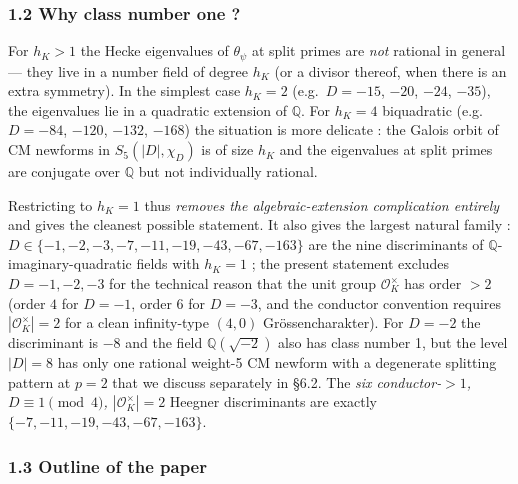 \documentclass[
  11pt,
  a4paper,
]{amsart}
\begin{document}
\hypertarget{why-class-number-one}{%
\subsubsection{1.2 Why class number one ?}\label{why-class-number-one}}

For \(h_K > 1\) the Hecke eigenvalues of \(\theta_\psi\) at split primes are \emph{not} rational in general --- they live in a number field of degree \(h_K\) (or a divisor thereof, when there is an extra symmetry). In the simplest case \(h_K = 2\) (e.g.~\(D = -15\), \(-20\), \(-24\), \(-35\)), the eigenvalues lie in a quadratic extension of \(\mathbb{Q}\). For \(h_K = 4\) biquadratic (e.g.~\(D = -84\), \(-120\), \(-132\), \(-168\)) the situation is more delicate : the Galois orbit of CM newforms in \(S_5(|D|, \chi_D)\) is of size \(h_K\) and the eigenvalues at split primes are conjugate over \(\mathbb{Q}\) but not individually rational.

Restricting to \(h_K = 1\) thus \emph{removes the algebraic-extension complication entirely} and gives the cleanest possible statement. It also gives the largest natural family : \(D \in \{-1, -2, -3, -7, -11, -19, -43, -67, -163\}\) are the nine discriminants of \(\mathbb{Q}\)-imaginary-quadratic fields with \(h_K = 1\) ; the present statement excludes \(D = -1, -2, -3\) for the technical reason that the unit group \(\mathcal{O}_K^\times\) has order \(> 2\) (order \(4\) for \(D = -1\), order \(6\) for \(D = -3\), and the conductor convention requires \(|\mathcal{O}_K^\times| = 2\) for a clean infinity-type \((4, 0)\) Grössencharakter). For \(D = -2\) the discriminant is \(-8\) and the field \(\mathbb{Q}(\sqrt{-2})\) also has class number 1, but the level \(|D| = 8\) has only one rational weight-5 CM newform with a degenerate splitting pattern at \(p = 2\) that we discuss separately in §6.2. The \emph{six conductor-\(> 1\), \(D \equiv 1 \pmod 4\), \(|\mathcal{O}_K^\times| = 2\)} Heegner discriminants are exactly \(\{-7, -11, -19, -43, -67, -163\}\).

\hypertarget{outline-of-the-paper}{%
\subsubsection{1.3 Outline of the paper}\label{outline-of-the-paper}}
\end{document}
